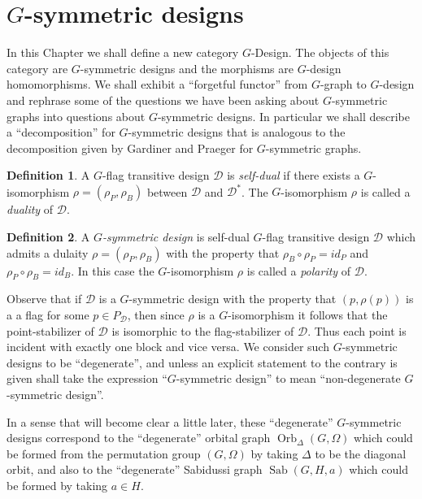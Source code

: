 \documentclass[12pt]{amsart}
\theoremstyle{plain}
\theoremstyle{definition}
\newtheorem{definition}{Definition}
\theoremstyle{remark}
\DeclareMathOperator{\orb}{Orb}
\DeclareMathOperator{\sab}{Sab}
\newcommand{\cD}{\mathcal{D}}
\begin{document}
\section{$G$-symmetric designs}

In this Chapter we shall define a new category $G$-Design.
The objects of this category are $G$-symmetric designs
and the morphisms are $G$-design homomorphisms.
We shall exhibit a ``forgetful functor'' from $G$-graph
to $G$-design and rephrase some of the questions we have
been asking about $G$-symmetric graphs into questions 
about $G$-symmetric designs.
In particular we shall describe a ``decomposition''
for $G$-symmetric designs that is analogous to the 
decomposition given by Gardiner and Praeger for $G$-symmetric graphs.

\begin{definition}
A $G$-flag transitive design $\cD$ is {\it self-dual}
if there exists a $G$-isomorphism $\rho = (\rho_P, \rho_B)$
between $\cD$ and $\cD^{*}$. 
The $G$-isomorphism $\rho$ is called a {\it duality} of $\cD$.
\end{definition}

\begin{definition}
A {\it $G$-symmetric design} is self-dual $G$-flag transitive design $\cD$
which admits a dulaity $\rho = (\rho_P, \rho_B)$ with the property that 
$\rho_B \circ \rho_P = id_P$ and $\rho_P \circ \rho_B = id_B$.
In this case the $G$-isomorphism $\rho$ is called a {\it polarity}
of $\cD$.
\end{definition}

Observe that if $\cD$ is a $G$-symmetric design with the property
that $(p, \rho(p))$ is a a flag for some $p \in P_\cD$,
then since $\rho$ is a $G$-isomorphism it follows
that the point-stabilizer of $\cD$ is isomorphic to the flag-stabilizer of $\cD$.
Thus each point is incident with exactly one block
and vice versa. 
We consider such $G$-symmetric designs to be ``degenerate'',
and unless an explicit statement to the contrary is given shall
take the expression ``$G$-symmetric design'' 
to mean ``non-degenerate $G$-symmetric design''.

In a sense that will become clear a little later, 
these ``degenerate'' $G$-symmetric
designs correspond to the ``degenerate'' orbital graph $\orb_\Delta(G,\Omega)$
which could be formed from the permutation group $(G, \Omega)$
by taking $\Delta$ to be the diagonal orbit,
and also to the ``degenerate'' Sabidussi graph $\sab(G,H,a)$
which could be formed by taking $a \in H$.
\hfill \break
\end{document}
